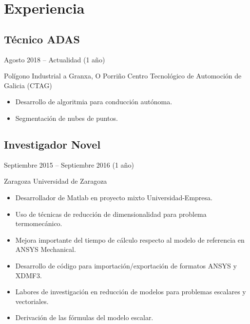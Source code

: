 \documentclass{article}
\begin{document}
\section{Experiencia}

\subsection{Técnico ADAS}
Agosto 2018 -- Actualidad (1 año)

Polígono Industrial a Granxa, O Porriño
Centro Tecnológico de Automoción de Galicia (CTAG)

\begin{itemize}
    \item Desarrollo de algoritmia para conducción autónoma.
    \item Segmentación de nubes de puntos.
\end{itemize}

\subsection{Investigador Novel}
Septiembre 2015 -- Septiembre 2016 (1 año)

Zaragoza
Universidad de Zaragoza

\begin{itemize}
    \item Desarrollador de Matlab en proyecto mixto Universidad-Empresa.
    \item Uso de técnicas de reducción de dimensionalidad para problema termomecánico.
    \item Mejora importante del tiempo de cálculo respecto al modelo de referencia en ANSYS Mechanical.
    \item Desarrollo de código para importación/exportación de formatos ANSYS y XDMF3.
    \item Labores de investigación en reducción de modelos para problemas escalares y vectoriales.
    \item Derivación de las fórmulas del modelo escalar.
\end{itemize}
    
\end{document}
